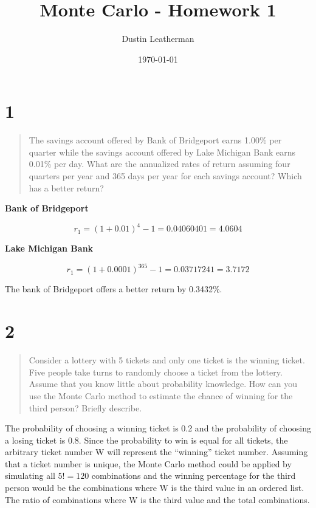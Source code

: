 \documentclass[11pt]{article}
\author{Dustin Leatherman}
\date{\today}
\title{Monte Carlo - Homework 1}
\begin{document}
\maketitle
\tableofcontents


\section{1}
\label{sec:org17452d4}

\begin{quote}
The savings account offered by Bank of Bridgeport earns 1.00\% per quarter while
the savings account offered by Lake Michigan Bank earns 0.01\% per day. What are
the annualized rates of return assuming four quarters per year and 365 days per
year for each savings account? Which has a better return?
\end{quote}

\textbf{Bank of Bridgeport}

$$
r_1 = (1 + 0.01)^4 - 1 = 0.04060401 = 4.0604%
$$


\textbf{Lake Michigan Bank}

$$
r_1 = (1 + 0.0001)^365 - 1 = 0.03717241 = 3.7172%
$$

The bank of Bridgeport offers a better return by 0.3432\%.

\section{2}
\label{sec:org0154c41}

\begin{quote}
Consider a lottery with 5 tickets and only one ticket is the winning ticket.
Five people take turns to randomly choose a ticket from the lottery. Assume that
you know little about probability knowledge. How can you use the Monte Carlo
method to estimate the chance of winning for the third person? Briefly describe.
\end{quote}

The probability of choosing a winning ticket is 0.2 and the probability of choosing a
losing ticket is 0.8. Since the probability to win is equal for all tickets, the
arbitrary ticket number W will represent the ``winning'' ticket number. Assuming
that a ticket number is unique, the Monte Carlo method could be applied by
simulating all \(5! = 120\) combinations and the winning percentage for the third
person would be the combinations where W is the third value in an ordered list.
The ratio of combinations where W is the third value and the total combinations.
\end{document}

